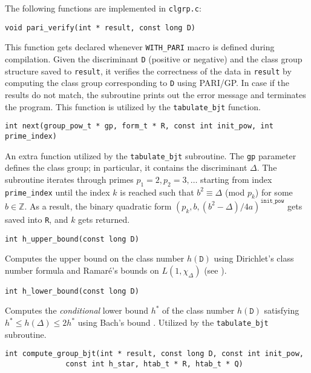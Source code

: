 \documentclass[a4paper,10pt]{article}
\newcommand{\code}{\lstinline}
\begin{document}
The following functions are implemented in \code{clgrp.c}:

\begin{lstlisting}
void pari_verify(int * result, const long D)
\end{lstlisting}

This function gets declared whenever \code{WITH_PARI} macro is defined during compilation. Given the discriminant \code{D} (positive or negative) and the class group structure saved to \code{result}, it verifies the correctness of the data in \code{result} by computing the class group corresponding to \code{D} using PARI/GP. In case if the results do not match, the subroutine prints out the error message and terminates the program. This function is utilized by the \code{tabulate_bjt} function.

\begin{lstlisting}
int next(group_pow_t * gp, form_t * R, const int init_pow, int prime_index)
\end{lstlisting}

An extra function utilized by the \code{tabulate_bjt} subroutine. The \code{gp} parameter defines the class group; in particular, it contains the discriminant $\Delta$. The subroutine iterates through primes $p_1 = 2, p_2 =3, \ldots$ starting from index \code{prime_index} until the index $k$ is reached such that $b^2 \equiv \Delta$ (mod $p_k$) for some $b \in \mathbb Z$. As a result, the binary quadratic form $\left(p_k, b, (b^2-\Delta)/4a\right)^{\texttt{init\_pow}}$ gets saved into \code{R}, and $k$ gets returned.

\begin{lstlisting}
int h_upper_bound(const long D)
\end{lstlisting}

Computes the upper bound on the class number $h(\texttt{D})$ using Dirichlet's class number formula and Ramar\'e's bounds on $L(1, \chi_\Delta)$ (see \cite[Section 4.3]{mosunov}).

\begin{lstlisting}
int h_lower_bound(const long D)
\end{lstlisting}

Computes the \emph{conditional} lower bound $h^*$ of the class number $h(\texttt{D})$ satisfying $h^* \leq h(\Delta) \leq 2h^*$ using Bach's bound \cite{bach}. Utilized by the \code{tabulate_bjt} subroutine.

\begin{lstlisting}
int compute_group_bjt(int * result, const long D, const int init_pow,
		      const int h_star, htab_t * R, htab_t * Q)
\end{lstlisting}
\end{document}
